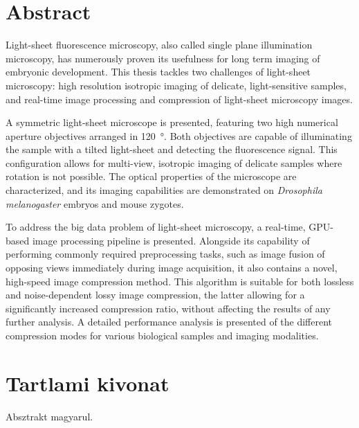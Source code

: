 
\chapter*{Abstract}
Light-sheet fluorescence microscopy, also called single plane illumination microscopy, has numerously proven its usefulness for long term imaging of embryonic development. This thesis tackles two challenges of light-sheet microscopy: high resolution isotropic imaging of delicate, light-sensitive samples, and real-time image processing and compression of light-sheet microscopy images.

A symmetric light-sheet microscope is presented, featuring two high numerical aperture objectives arranged in \SI{120}{\degree}. Both objectives are capable of illuminating the sample with a tilted light-sheet and detecting the fluorescence signal. This configuration allows for multi-view, isotropic imaging of delicate samples where rotation is not possible. The optical properties of the microscope are characterized, and its imaging capabilities are demonstrated on \textit{Drosophila melanogaster} embryos and mouse zygotes.

To address the big data problem of light-sheet microscopy, a real-time, GPU-based image processing pipeline is presented.
Alongside its capability of performing commonly required preprocessing tasks, such as image fusion of opposing views immediately during image acquisition, it also contains a novel, high-speed image compression method. This algorithm is suitable for both lossless and noise-dependent lossy image compression, the latter allowing for a significantly increased compression ratio, without affecting the results of any further analysis.
A detailed performance analysis is presented of the different compression modes for various biological samples and imaging modalities.







\chapter*{Tartlami kivonat}
Absztrakt magyarul.
